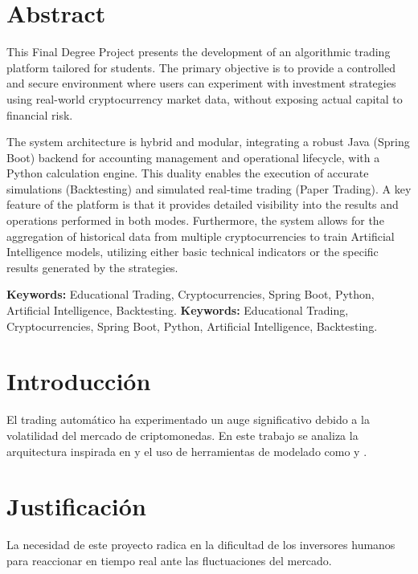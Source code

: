 \documentclass[12pt, letterpaper]{article}
\begin{document}
\newpage
\section*{Abstract}
This Final Degree Project presents the development of an algorithmic trading platform tailored for students. The primary objective is to provide a controlled and secure environment where users can experiment with investment strategies using real-world cryptocurrency market data, without exposing actual capital to financial risk.

The system architecture is hybrid and modular, integrating a robust Java (Spring Boot) backend for accounting management and operational lifecycle, with a Python calculation engine. This duality enables the execution of accurate simulations (Backtesting) and simulated real-time trading (Paper Trading). A key feature of the platform is that it provides detailed visibility into the results and operations performed in both modes. Furthermore, the system allows for the aggregation of historical data from multiple cryptocurrencies to train Artificial Intelligence models, utilizing either basic technical indicators or the specific results generated by the strategies.

\vspace{0.5cm}
\noindent \textbf{Keywords:} Educational Trading, Cryptocurrencies, Spring Boot, Python, Artificial Intelligence, Backtesting.
\vspace{0.5cm}
\noindent \textbf{Keywords:} Educational Trading, Cryptocurrencies, Spring Boot, Python, Artificial Intelligence, Backtesting.

\newpage
\tableofcontents

\newpage
\section{Introducción}
El trading automático ha experimentado un auge significativo debido a la volatilidad del mercado de criptomonedas. En este trabajo se analiza la arquitectura inspirada en \textcite{freqtrade2026} y el uso de herramientas de modelado como \textcite{mermaid2026} y \textcite{plantuml2026}.

\section{Justificación}
La necesidad de este proyecto radica en la dificultad de los inversores humanos para reaccionar en tiempo real ante las fluctuaciones del mercado.
\end{document}
